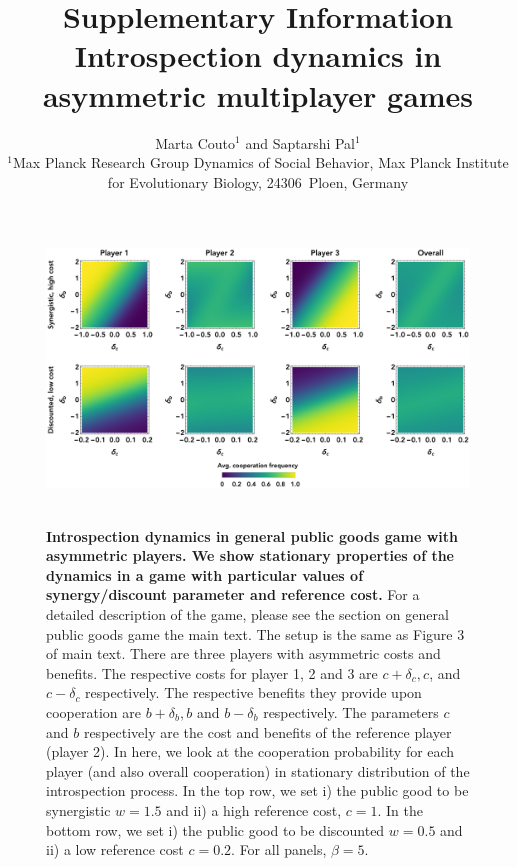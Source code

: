 \documentclass[11pt]{article}
\title{\vspace{0pt} \sffamily \Large Supplementary Information\\[0.1cm] {\bfseries Introspection dynamics in asymmetric multiplayer games}}
\date{\empty}
\author{\parbox[c]{16cm}{\centering \onehalfspacing \fontsize{11}{12}\selectfont Marta Couto$^1$ and Saptarshi Pal$^1$\\[0.2cm]
$^1$Max Planck Research Group Dynamics of Social Behavior, Max Planck Institute for Evolutionary Biology, 24306~Ploen, Germany}}
\theoremstyle{plainCl1}
\theoremstyle{plainCl2}
\begin{document}
\maketitle
\onehalfspacing



\begin{figure}[h!]
\centering
\includegraphics[width =  \textwidth]{figures/Supfigure1.eps}~\\[0.4cm]
\caption{\onehalfspacing
\textbf{Introspection dynamics in general public goods game with asymmetric players. We show stationary properties of the dynamics in a game with particular values of synergy/discount parameter and reference cost.} For a detailed description of the game, please see the section on general public goods game the main text. The setup is the same as Figure 3 of main text. There are three players with asymmetric costs and benefits. The respective costs for player 1, 2 and 3 are $c + \delta_c, c$, and $c - \delta_c$ respectively. The respective benefits they provide upon cooperation are $b + \delta_b, b$ and $b - \delta_b$ respectively. The parameters $c$ and $b$ respectively are the cost and benefits of the reference player (player 2). In here, we look at the cooperation probability for each player (and also overall cooperation) in stationary distribution of the introspection process. In the top row, we set i) the public good to be synergistic $w = 1.5$ and ii) a high reference cost, $c = 1$. In the bottom row, we set i) the public good to be discounted $w = 0.5$ and ii) a low reference cost $c = 0.2$. For all panels, $\beta = 5$.}
 
\label{Fig:Supp-Fig1}
\end{figure}
\clearpage
\end{document}
